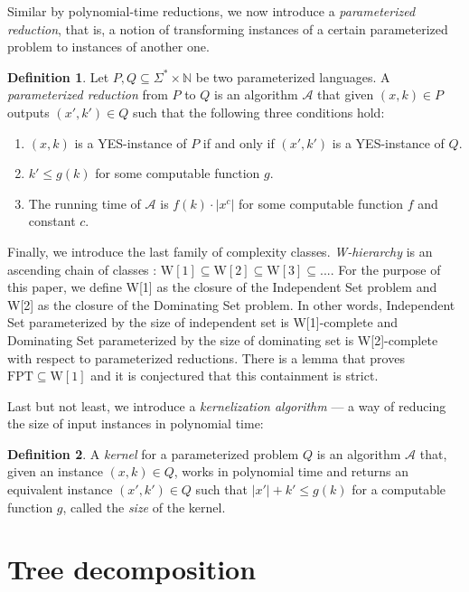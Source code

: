\documentclass[en]{pracamgr}
\theoremstyle{definition}
\newtheorem{definition}{Definition}
\newcommand{\domsetp}{{\sc Dominating Set}}
\newcommand{\indset}{{\sc Independent Set}}
\newcommand{\w}[1]{\textrm{W}[#1]}
\begin{document}
Similar by polynomial-time reductions, we now introduce a \textit{parameterized reduction}, that is, a notion of transforming instances of a certain parameterized problem to instances of another one.

\begin{definition}
	Let $P,Q \subseteq \Sigma^* \times \mathbb{N}$ be two parameterized languages. A  \textit{parameterized reduction} from $P$ to $Q$ is an algorithm $\mathcal{A}$ that given $(x,k) \in P$ outputs $(x',k') \in Q$ such that the following three conditions hold:
	\begin{enumerate}
		\item $(x,k)$ is a YES-instance of $P$ if and only if $(x',k')$ is a YES-instance of $Q$.
		\item $k' \leq g(k)$ for some computable function $g$.
		\item The running time of $\mathcal{A}$ is $f(k) \cdot |x^c|$ for some computable function $f$ and constant $c$.
	\end{enumerate}
\end{definition}

Finally, we introduce the last family of complexity classes. \emph{W-hierarchy} is an ascending chain of classes : $\w{1} \subseteq \w{2} \subseteq \w{3} \subseteq...$. For the purpose of this paper, we define \w{1} as the closure of the \indset{} problem and \w{2} as the closure of the \domsetp{} problem. In other words, \indset{} parameterized by the size of independent set is  \w{1}-complete and \domsetp{} parameterized by the size of dominating set is \w{2}-complete with respect to parameterized reductions. There is a lemma that proves $\textrm{FPT} \subseteq \w{1}$ and it is conjectured that this containment is strict.

Last but not least, we introduce a \emph{kernelization algorithm} --- a way of reducing the size of input instances in polynomial time:

\begin{definition}\label{Kernel}
	A \textit{kernel} for a parameterized problem $Q$ is an algorithm $\mathcal{A}$ that, given an instance $(x,k) \in Q$, works in polynomial time and returns an equivalent instance $(x',k') \in Q$
	such that $|x'| + k' \leq g(k)$ for a computable function $g$, called the \textit{size} of the kernel.
\end{definition}

\section{Tree decomposition}
\end{document}
